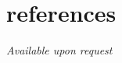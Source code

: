 \documentclass[paper=a4,fontsize=11pt]{scrartcl} %
\newcommand{\NewPart}[1]{\section*{\lowercase{#1}}}
\begin{document}


\NewPart{References}{}
\hspace{0.6cm} \textit{Available upon request}

\end{document}
